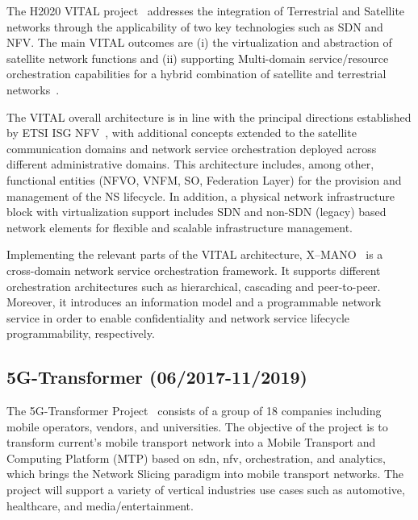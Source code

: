 The H2020 VITAL project~\cite{vital} addresses the integration of Terrestrial and Satellite networks through the applicability of two key technologies such as SDN and NFV. The main VITAL outcomes are (i) the virtualization and abstraction of satellite network functions and (ii) supporting Multi-domain service/resource orchestration capabilities for a hybrid combination of satellite and terrestrial networks~\cite{vitalD23}. 

The VITAL overall architecture is in line with the principal directions established by ETSI ISG NFV~\cite{ETSIIndustrySpecificationGroupISGNFV2013NetworkFramework}, with additional concepts extended to the satellite communication domains and network service orchestration deployed across different administrative domains. This architecture includes, among other, functional entities (NFVO, VNFM, SO, Federation Layer) for the provision and management of the NS lifecycle. In addition, a physical network infrastructure block with virtualization support includes SDN and non-SDN (legacy) based network elements for flexible and scalable infrastructure management.

Implementing the relevant parts of the VITAL architecture, X--MANO~\cite{francescon2017x} is a cross-domain network service orchestration framework. It supports different orchestration architectures such as hierarchical, cascading and peer-to-peer. Moreover, it introduces an information model and a programmable network service in order to enable confidentiality and network service lifecycle programmability, respectively.


\subsection{5G-Transformer (06/2017-11/2019)}
The 5G-Transformer Project~\cite{5g-TransformerProject20175GVerticals} consists of a group of 18 companies including mobile operators, vendors, and universities. The objective of the project is to transform current’s mobile transport network into a Mobile Transport and Computing Platform (MTP) based on \gls{sdn}, \gls{nfv}, orchestration, and analytics, which brings the Network Slicing paradigm into mobile transport networks. The project will support a variety of vertical industries use cases such as automotive, healthcare, and media/entertainment. 

